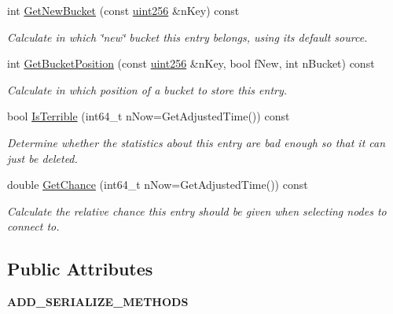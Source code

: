 \begin{DoxyCompactItemize}
int \mbox{\hyperlink{class_c_addr_info_a04ac79764971242edce1e82aefb2aea0}{Get\+New\+Bucket}} (const \mbox{\hyperlink{classuint256}{uint256}} \&n\+Key) const
\begin{DoxyCompactList}\small\item\em Calculate in which \char`\"{}new\char`\"{} bucket this entry belongs, using its default source. \end{DoxyCompactList}\item 
\mbox{\label{class_c_addr_info_a3a133ffb3fbf67cbeb5f4bc683fa9126}} 
int \mbox{\hyperlink{class_c_addr_info_a3a133ffb3fbf67cbeb5f4bc683fa9126}{Get\+Bucket\+Position}} (const \mbox{\hyperlink{classuint256}{uint256}} \&n\+Key, bool f\+New, int n\+Bucket) const
\begin{DoxyCompactList}\small\item\em Calculate in which position of a bucket to store this entry. \end{DoxyCompactList}\item 
\mbox{\label{class_c_addr_info_a600725db90b879aee92128a3409af8aa}} 
bool \mbox{\hyperlink{class_c_addr_info_a600725db90b879aee92128a3409af8aa}{Is\+Terrible}} (int64\+\_\+t n\+Now=Get\+Adjusted\+Time()) const
\begin{DoxyCompactList}\small\item\em Determine whether the statistics about this entry are bad enough so that it can just be deleted. \end{DoxyCompactList}\item 
\mbox{\label{class_c_addr_info_af6788fe5a5364e63896ab9dedb8e5d40}} 
double \mbox{\hyperlink{class_c_addr_info_af6788fe5a5364e63896ab9dedb8e5d40}{Get\+Chance}} (int64\+\_\+t n\+Now=Get\+Adjusted\+Time()) const
\begin{DoxyCompactList}\small\item\em Calculate the relative chance this entry should be given when selecting nodes to connect to. \end{DoxyCompactList}\end{DoxyCompactItemize}
\subsection*{Public Attributes}
\begin{DoxyCompactItemize}
\item 
\mbox{\label{class_c_addr_info_a9d5e0b95fa494171e4bffb900094fe2e}} 
{\bfseries A\+D\+D\+\_\+\+S\+E\+R\+I\+A\+L\+I\+Z\+E\+\_\+\+M\+E\+T\+H\+O\+DS}
\end{DoxyCompactItemize}
